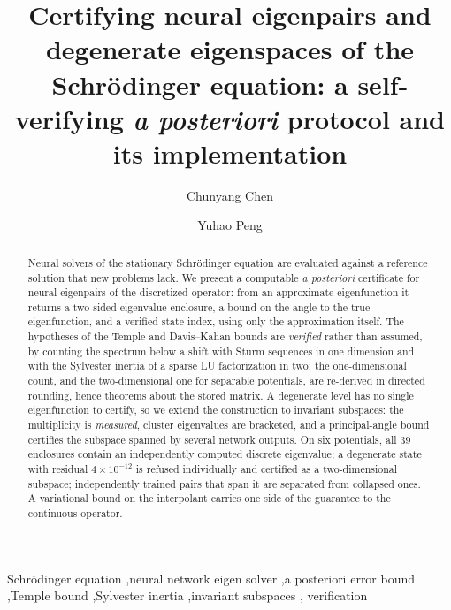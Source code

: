 \documentclass[preprint,12pt,number]{elsarticle}
\begin{document}
\begin{frontmatter}

\title{Certifying neural eigenpairs and degenerate eigenspaces of the Schr\"odinger
equation: a self-verifying \emph{a posteriori} protocol and its implementation}

\author[inst1]{Chunyang Chen}
\author[inst1]{Yuhao Peng}

\begin{abstract}
Neural solvers of the stationary Schr\"odinger equation are evaluated against
a reference solution that new problems lack. We present a computable
\emph{a posteriori} certificate for neural eigenpairs of the discretized
operator: from an approximate eigenfunction it returns a two-sided eigenvalue
enclosure, a bound on the angle to the true eigenfunction, and a verified
state index, using only the approximation itself. The hypotheses of the
Temple and Davis--Kahan bounds are \emph{verified} rather than assumed, by
counting the spectrum below a shift with Sturm sequences in one dimension and
with the Sylvester inertia of a sparse LU factorization in two; the
one-dimensional count, and the two-dimensional one for separable potentials,
are re-derived in directed rounding, hence theorems about the stored matrix.
A degenerate level has no single eigenfunction to certify, so we extend the
construction to invariant subspaces: the multiplicity is \emph{measured},
cluster eigenvalues are bracketed, and a principal-angle bound certifies the
subspace spanned by several network outputs. On six potentials, all $39$
enclosures contain an independently computed discrete eigenvalue; a
degenerate state with residual $4\times10^{-12}$ is refused individually and
certified as a two-dimensional subspace; independently trained pairs that
span it are separated from collapsed ones. A variational bound on the
interpolant carries one side of the guarantee to the continuous operator.
\end{abstract}

\begin{keyword}
Schr\"odinger equation \sep neural network eigen solver \sep a posteriori error
bound \sep Temple bound \sep Sylvester inertia \sep invariant subspaces \sep
verification
\end{keyword}

\end{frontmatter}
\end{document}
